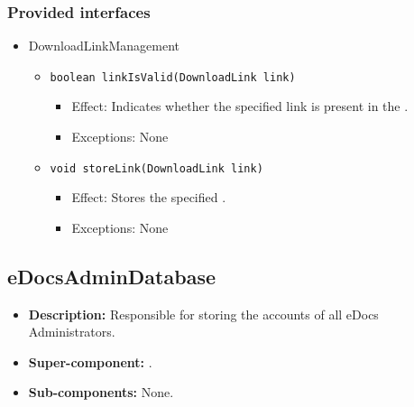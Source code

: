 \subsubsection*{Provided interfaces}
\begin{itemize}
    \item DownloadLinkManagement
    \begin{itemize}
        \item \texttt{boolean linkIsValid(DownloadLink link)}
        \begin{itemize}
            \item Effect: Indicates whether the specified link is present in the .
            \item Exceptions: None
        \end{itemize}

        \item \texttt{void storeLink(DownloadLink link)}
		    \begin{itemize}
                \item Effect: Stores the specified .
                \item Exceptions: None
            \end{itemize}
    \end{itemize}
\end{itemize}

\subsection{eDocsAdminDatabase}
\begin{itemize}
    \item \textbf{Description:} Responsible for storing the accounts of all eDocs Administrators.
    \item \textbf{Super-component:} .
    \item \textbf{Sub-components:} None.
\end{itemize}

